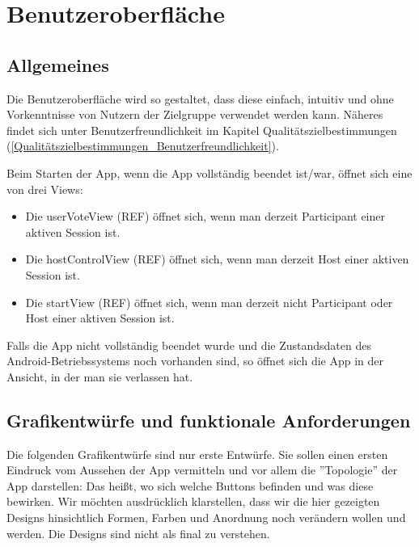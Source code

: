 \documentclass[oneside, ngerman]{sdqtechreport}
\begin{document}
\chapter{Benutzeroberfläche}
\label{chap:Benutzeroberfläche}

\section{Allgemeines}
\label{sec:Benutzeroberfläche:Allgemeines}
Die Benutzeroberfläche wird so gestaltet, dass diese einfach, intuitiv und ohne Vorkenntnisse von Nutzern der Zielgruppe verwendet werden kann. Näheres findet sich unter Benutzerfreundlichkeit im Kapitel Qualitätszielbestimmungen (\ref{Qualitätszielbestimmungen_Benutzerfreundlichkeit}).

Beim Starten der App, wenn die App vollständig beendet ist/war, öffnet sich eine von drei Views:
\begin{itemize}
    \item Die userVoteView (REF) öffnet sich, wenn man derzeit Participant einer aktiven Session ist.
    \item Die hostControlView (REF) öffnet sich, wenn man derzeit Host einer aktiven Session ist.
    \item Die startView (REF) öffnet sich, wenn man derzeit nicht Participant oder Host einer aktiven Session ist.
\end{itemize}
Falls die App nicht vollständig beendet wurde und die Zustandsdaten des Android-Betriebssystems noch vorhanden sind, so öffnet sich die App in der Ansicht, in der man sie verlassen hat.



\newpage

\section{Grafikentwürfe und funktionale Anforderungen}
\label{sec:Benutzeroberfläche:Grafiken}

Die folgenden Grafikentwürfe sind nur erste Entwürfe. Sie sollen einen ersten Eindruck vom Aussehen der App vermitteln und vor allem die ''Topologie'' der App darstellen: Das heißt, wo sich welche Buttons befinden und was diese bewirken. Wir möchten ausdrücklich klarstellen, dass wir die hier gezeigten Designs hinsichtlich Formen, Farben und Anordnung noch verändern wollen und werden. Die Designs sind nicht als final zu verstehen.
\end{document}
